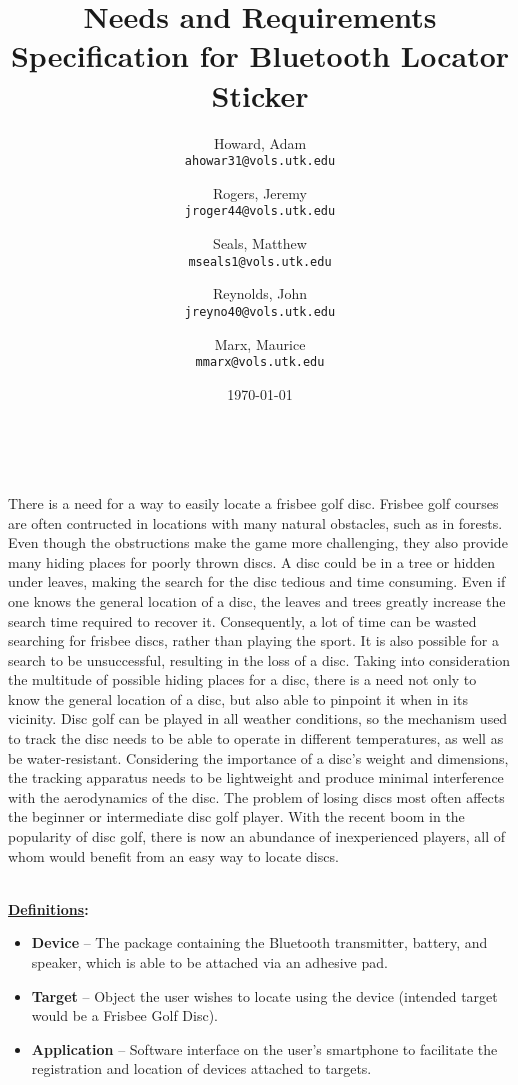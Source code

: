 \documentclass[12pt]{article}
\author{
  Howard, Adam\\
  \texttt{ahowar31@vols.utk.edu}
  \and
  Rogers, Jeremy\\
  \texttt{jroger44@vols.utk.edu}
  \and
  Seals, Matthew\\
  \texttt{mseals1@vols.utk.edu}
  \and
  Reynolds, John\\
  \texttt{jreyno40@vols.utk.edu}
  \and
  Marx, Maurice\\
  \texttt{mmarx@vols.utk.edu}
}
\title{Needs and Requirements Specification for Bluetooth Locator Sticker}
\date{\today}
\begin{document}
  \maketitle
  \pagebreak
   \\

  \vspace{16 pt}

  There is a need for a way to easily locate a frisbee golf disc. Frisbee golf
  courses are often contructed in locations with many natural obstacles, such
  as in forests. Even though the obstructions make the game more challenging,
  they also provide many hiding places for poorly thrown discs. A disc could be
  in a tree or hidden under leaves, making the search for the disc tedious and
  time consuming. Even if one knows the general location of a disc, the leaves
  and trees greatly increase the search time required to recover it.
  Consequently, a lot of time can be wasted searching for frisbee discs, rather
  than playing the sport. It is also possible for a search to be unsuccessful,
  resulting in the loss of a disc. Taking into consideration the multitude of
  possible hiding places for a disc, there is a need not only to know the 
  general location of a disc, but also able to pinpoint it when in its vicinity.
  Disc golf can be played in all weather conditions, so the mechanism used to
  track the disc needs to be able to operate in different temperatures, as well
  as be water-resistant. Considering the importance of a disc's weight and
  dimensions, the tracking apparatus needs to be lightweight and produce minimal
  interference with the aerodynamics of the disc. The problem of losing discs
  most often affects the beginner or intermediate disc golf player. With the
  recent boom in the popularity of disc golf, there is now an abundance of
  inexperienced players, all of whom would benefit from an easy way to locate
  discs.

  \pagebreak

   \\

  \vspace{16 pt}
  \indent\textbf{\underline{Definitions}:}
  \begin{itemize}
    \item \textbf{Device} -- The package containing the Bluetooth transmitter,
    battery, and speaker, which is able to be attached via an adhesive pad.
    \item \textbf{Target} -- Object the user wishes to locate using the device
    (intended target would be a Frisbee Golf Disc).
    \item \textbf{Application} -- Software interface on the user's smartphone
    to facilitate the registration and location of devices attached to targets.
  \end{itemize}
\end{document}
